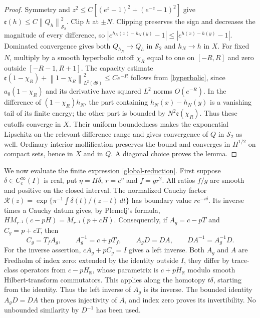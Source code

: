 \documentclass[a4paper,11pt]{amsart}
\theoremstyle{remark}\newtheorem{remark}[theorem]{Remark}
\newcommand{\HS}{\mathcal S_2}
\newcommand{\R}{\mathbb R}
\newcommand{\dd}{\,d}
\newcommand{\norm}[1]{\left\lVert#1\right\rVert}
\begin{document}
\begin{proof}
Symmetry and
$z^2\le C[(e^z-1)^2+(e^{-z}-1)^2]$ give
$\mathfrak e(h)\le C\norm{Q_h}_{\HS}^2$.
Clip $h$ at $\pm N$. Clipping preserves the sign and decreases
the magnitude of every difference, so
$|e^{h_N(x)-h_N(y)}-1|\le|e^{h(x)-h(y)}-1|$.
Dominated convergence gives both $Q_{h_N}\to Q_h$ in $\HS$ and
$h_N\to h$ in $X$.
For fixed $N$, multiply by a smooth hyperbolic cutoff $\chi_R$
equal to one on $[-R,R]$ and zero outside $[-R-1,R+1]$.
The capacity estimate
$\mathfrak e(1-\chi_R)+\norm{1-\chi_R}_{L^2(d\theta)}^2
 \le Ce^{-R}$ follows from \eqref{hyperbolic}, since
$a_0(1-\chi_R)$ and its derivative have squared $L^2$ norms
$O(e^{-R})$. In the difference of $(1-\chi_R)h_N$, the part
containing $h_N(x)-h_N(y)$ is a vanishing tail of its finite
energy; the other part is bounded by $N^2\mathfrak e(\chi_R)$.
Thus these cutoffs converge in $X$. Their uniform boundedness makes
the exponential Lipschitz on the relevant difference range and
gives convergence of $Q$ in $\HS$ as well.
Ordinary interior mollification preserves the bound and converges
in $H^{1/2}$ on compact sets, hence in $X$ and in $Q$.
A diagonal choice proves the lemma.
\end{proof}

We now evaluate the finite expression \eqref{global-reduction}.
First suppose $\delta\in C_c^\infty(I)$ is real, put
$\eta=H\delta$, $r=e^\eta$ and $f=gr^2$.
All ratios $f/g$ are smooth and positive on the closed interval.
The normalized Cauchy factor
$\mathcal R(z)=\exp\{\pi^{-1}\int\delta(t)/(z-t)\dd t\}$ has
boundary value $r e^{-i\delta}$. Its inverse times a Cauchy datum
gives, by Plemelj's formula,
$HM_{r^{-1}}(c-pH)=M_{r^{-1}}(p+cH)$.
Consequently, if $A_g=c-pT$ and $C_g=p+cT$, then
\begin{equation}\label{smooth-inverse}
 C_g=T_fA_g,\qquad A_g^{-1}=c+pT_f,\qquad
 A_gD=DA,\qquad DA^{-1}=A_g^{-1}D.
\end{equation}
For the inverse assertion, $cA_g+pC_g=I$ gives a left inverse.
Both $A_g$ and $A$ are Fredholm of index zero: extended by the
identity outside $I$, they differ by trace-class operators from
$c-pH_{\R}$, whose parametrix is $c+pH_{\R}$ modulo smooth
Hilbert-transform commutators. This applies along the homotopy
$t\delta$, starting from the identity. Thus the left inverse of
$A_g$ is its inverse. The bounded identity $A_gD=DA$ then proves
injectivity of $A$, and index zero proves its invertibility.
No unbounded similarity by $D^{-1}$ has been used.
\end{document}
